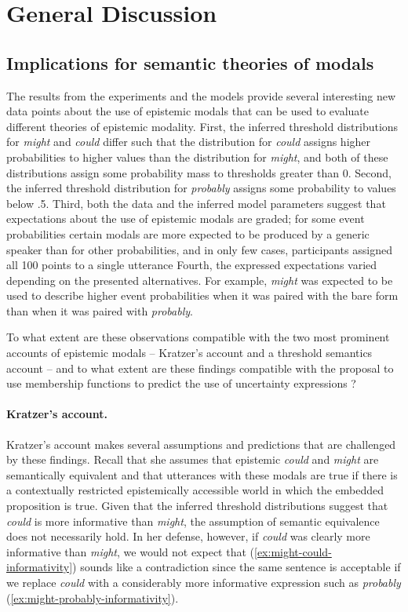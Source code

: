 \section{General Discussion}


\subsection{Implications for semantic theories of modals}
The results from the experiments and the models provide several interesting new data points about the use
of epistemic modals that can be used to evaluate different theories of epistemic modality. First, the inferred threshold 
distributions for \textit{might} and \textit{could} differ such that the distribution for \textit{could} assigns higher probabilities 
to higher values than the distribution for \textit{might}, and both of these distributions assign some probability mass to thresholds
greater than 0. Second, the inferred threshold distribution
for \textit{probably} assigns some probability to values below .5. Third, both the data
and the inferred model parameters suggest that expectations about the use of epistemic modals are graded; for some
event probabilities certain modals are more expected to be produced by a generic speaker than for other probabilities,
and in only few cases, participants assigned all 100 points to a single utterance Fourth, the expressed expectations varied 
depending on the presented alternatives. For example, \textit{might} was expected to be used to describe higher event probabilities 
when it was paired with the bare form than when it was paired with
\textit{probably}.


 To what extent are these observations compatible with the two most prominent accounts of epistemic modals -- Kratzer's \cite{Kratzer2012}
account and a threshold semantics account \cite{Lassiter2017,Swanson2006,Yalcin2010} -- and to what extent are these findings 
compatible with the proposal to use membership functions to predict the use of uncertainty expressions \cite{Wallssten}?

\paragraph{Kratzer's account.} Kratzer's account makes several assumptions and predictions that are challenged by these findings. Recall that she assumes that epistemic \textit{could} and
\textit{might} are semantically equivalent and that utterances with these modals are true if there is a contextually restricted epistemically accessible
world in which the embedded proposition is true. Given that the inferred threshold distributions suggest that \textit{could} is more informative than \textit{might},
the assumption of semantic equivalence does not necessarily hold. In her defense, however, if \textit{could} was clearly more informative than \textit{might},
we would not expect that (\ref{ex:might-could-informativity}) sounds like a contradiction since the same sentence is acceptable if we replace \textit{could} with
a considerably more informative expression such as \textit{probably} (\ref{ex:might-probably-informativity}).


